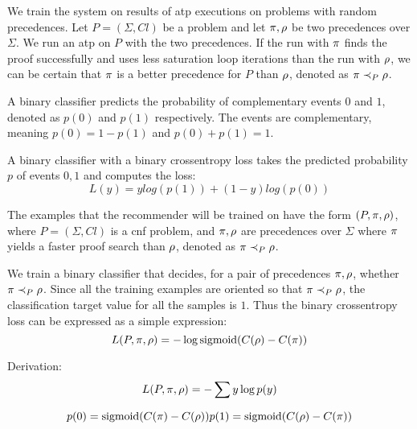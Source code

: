 

We train the system on results of \gls{atp} executions on problems with random precedences.
Let $P = (\Sigma, \mathit{Cl})$ be a problem
and let $\pi, \rho$ be two precedences over $\Sigma$.
We run an \gls{atp} on $P$ with the two precedences.
If the run with $\pi$ finds the proof successfully and uses less saturation loop iterations than the run with $\rho$,
we can be certain that $\pi$ is a better precedence for $P$ than $\rho$,
denoted as $\pi \prec_{P} \rho$.

A binary classifier predicts the probability of complementary events $0$ and $1$,
denoted as $p(0)$ and $p(1)$ respectively.
The events are complementary,
meaning $p(0) = 1 - p(1)$ and $p(0) + p(1) = 1$.

A binary classifier with a binary crossentropy loss
takes the predicted probability $p$ of events $0, 1$
and computes the loss:
$$
L(y) = y log(p(1)) + (1-y) log(p(0))
$$

The examples that the recommender will be trained on have the form
$(P, \pi, \rho)$, where $P = (\Sigma, \mathit{Cl})$ is a \gls{cnf} problem, and $\pi, \rho$ are precedences over $\Sigma$
where $\pi$ yields a faster proof search than $\rho$,
denoted as $\pi \prec_{P} \rho$.

We train a binary classifier that decides,
for a pair of precedences $\pi, \rho$,
whether $\pi \prec_{P} \rho$.
Since all the training examples are oriented so that $\pi \prec_{P} \rho$,
the classification target value for all the samples is $1$.
Thus the binary crossentropy loss can be expressed as a simple expression:
$$
L(P, \pi, \rho) = - \log \operatorname{sigmoid} (C(\rho) - C(\pi))
$$

Derivation:
$$
L(P, \pi, \rho) = - \sum y \log p(y)
$$

$$
p(0) = \operatorname{sigmoid} (C(\pi) - C(\rho)) \\
p(1) = \operatorname{sigmoid} (C(\rho) - C(\pi))
$$

